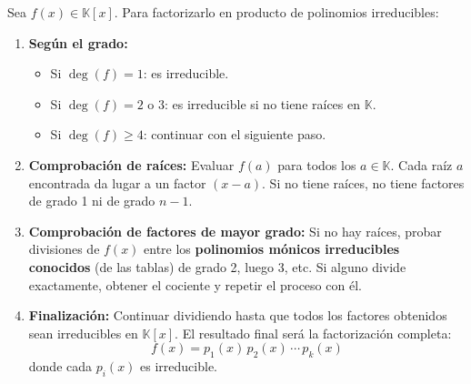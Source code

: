 \documentclass[a4paper,12pt]{article}
\begin{document}
\begin{procedimiento}[title=Procedimiento para factorizar un polinomio en \(\mathbb{K}\)]
Sea \(f(x) \in \mathbb{K}[x]\). Para factorizarlo en producto de polinomios irreducibles:

\begin{enumerate}
  \item \textbf{Según el grado:}
  \begin{itemize}
    \item Si \(\deg(f) = 1\): es irreducible.
    \item Si \(\deg(f) = 2\) o \(3\): es irreducible si no tiene raíces en \(\mathbb{K}\).
    \item Si \(\deg(f) \ge 4\): continuar con el siguiente paso.
  \end{itemize}

  \item \textbf{Comprobación de raíces:}  
  Evaluar \(f(a)\) para todos los \(a \in \mathbb{K}\).  
  Cada raíz \(a\) encontrada da lugar a un factor \((x - a)\).  
  Si no tiene raíces, no tiene factores de grado 1 ni de grado \(n-1\).

  \item \textbf{Comprobación de factores de mayor grado:}  
  Si no hay raíces, probar divisiones de \(f(x)\) entre los \textbf{polinomios mónicos irreducibles conocidos} (de las tablas) de grado 2, luego 3, etc.  
  Si alguno divide exactamente, obtener el cociente y repetir el proceso con él.

  \item \textbf{Finalización:}  
  Continuar dividiendo hasta que todos los factores obtenidos sean irreducibles en \(\mathbb{K}[x]\).  
  El resultado final será la factorización completa:
  \[
  f(x) = p_1(x) \, p_2(x) \, \cdots \, p_k(x)
  \]
  donde cada \(p_i(x)\) es irreducible.
\end{enumerate}
\end{procedimiento}
\end{document}
